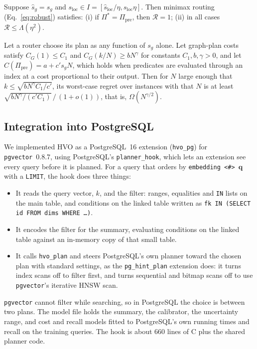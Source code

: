 \documentclass[sigconf, nonacm]{acmart}
\newcommand{\sg}{s_g}
\newcommand{\sloc}{s_{\text{loc}}}
\newcommand{\Ppre}{\Pi_{\text{pre}}}
\begin{document}
\begin{theorem}\label{thm:robust}
Suppose $\hat s_g=\sg$ and $\sloc\in I=[\hat s_{\text{loc}}/\eta,\hat s_{\text{loc}}\eta]$. Then minimax routing (Eq.~\eqref{eq:robust}) satisfies: (i) if $\Pi^*=\Ppre$, then $\mathcal{R}=1$; (ii) in all cases $\mathcal{R}\le\Lambda(\eta^2)$.
\end{theorem}

\begin{proposition}\label{prop:unbounded}
Let a router choose its plan as any function of $\sg$ alone. Let graph-plan costs satisfy $C_G(1)\le C_1$ and $C_G(k/N)\ge bN^\gamma$ for constants $C_1,b,\gamma>0$, and let $C(\Ppre)=a+c'\sg N$, which holds when predicates are evaluated through an index at a cost proportional to their output. Then for $N$ large enough that $k\le\sqrt{bN^\gamma C_1/c'}$, its worst-case regret over instances with that $N$ is at least $\sqrt{bN^\gamma/(c'C_1)}\,/\,(1+o(1))$, that is, $\Omega(N^{\gamma/2})$.
\end{proposition}

\subsection{Integration into PostgreSQL}\label{sec:pg}
We implemented HVO as a PostgreSQL~16 extension (\texttt{hvo\_pg}) for \texttt{pgvector}~0.8.7, using PostgreSQL's \texttt{planner\_hook}, which lets an extension see every query before it is planned. For a query that orders by \texttt{embedding <\#> $\mathbf{q}$} with a \texttt{LIMIT}, the hook does three things:
\begin{itemize}
    \item It reads the query vector, $k$, and the filter: ranges, equalities and \texttt{IN} lists on the main table, and conditions on the linked table written as \texttt{fk IN (SELECT id FROM dims WHERE \ldots)}.
    \item It encodes the filter for the summary, evaluating conditions on the linked table against an in-memory copy of that small table.
    \item It calls \texttt{hvo\_plan} and steers PostgreSQL's own planner toward the chosen plan with standard settings, as the \texttt{pg\_hint\_plan} extension does: it turns index scans off to filter first, and turns sequential and bitmap scans off to use \texttt{pgvector}'s iterative HNSW scan.
\end{itemize}
\texttt{pgvector} cannot filter while searching, so in PostgreSQL the choice is between two plans. The model file holds the summary, the calibrator, the uncertainty range, and cost and recall models fitted to PostgreSQL's own running times and recall on the training queries. The hook is about 660 lines of C plus the shared planner code.
\end{document}
